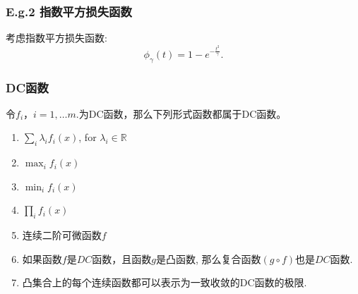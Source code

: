 \documentclass{beamer}
\begin{document}
 \begin{frame}
   \frametitle{E.g.2  指数平方损失函数}

考虑指数平方损失函数:
  $$
\phi_{\gamma}(t) = 1 - e^{-\frac{t^2}{\gamma}}.
$$



\end{frame}





\begin{frame}
\frametitle{DC函数}
\begin{proposition}[命题]
令$f_{i}$，$i=1, \ldots m.$为DC函数，那么下列形式函数都属于DC函数。
\begin{enumerate}[(1)]
	\item $\sum_{i} \lambda_{i} f_{i}(x)$, for $\lambda_{i} \in \mathbb{R}$
	\item $\max _{i} f_{i}(x)$
	\item $\min _{i} f_{i}(x)$
	\item $\prod_{i} f_{i}(x)$
	\item  连续二阶可微函数$f$ 
	\item 如果函数$f$是$D C$函数，且函数$g$是凸函数, 那么复合函数$(g \circ f)$也是$D C$函数.
    \item 凸集合上的每个连续函数都可以表示为一致收敛的DC函数的极限.
\end{enumerate}
\end{proposition}
\end{frame}
\end{document}
